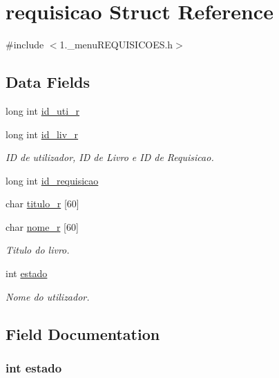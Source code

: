 \hypertarget{structrequisicao}{\section{requisicao Struct Reference}
\label{structrequisicao}
}


{\ttfamily \#include $<$1.\+\_\+menu\+R\+E\+Q\+U\+I\+S\+I\+C\+O\+E\+S.\+h$>$}

\subsection*{Data Fields}
\begin{DoxyCompactItemize}
\item 
long int \hyperlink{structrequisicao_a46ba42e509577cf7ad9429d2293ff577}{id\+\_\+uti\+\_\+r}
\item 
long int \hyperlink{structrequisicao_af636ce6e374d3e55eeb00565c29faf01}{id\+\_\+liv\+\_\+r}
\begin{DoxyCompactList}\small\item\em I\+D de utilizador, I\+D de Livro e I\+D de Requisicao. \end{DoxyCompactList}\item 
long int \hyperlink{structrequisicao_a83bcbbb52167d11b977097b6e3c282c9}{id\+\_\+requisicao}
\item 
char \hyperlink{structrequisicao_aa943485cb21e39e8c25250f36453db59}{titulo\+\_\+r} \mbox{[}60\mbox{]}
\item 
char \hyperlink{structrequisicao_a1c7ba6d3e1e3e317652826e28fd517aa}{nome\+\_\+r} \mbox{[}60\mbox{]}
\begin{DoxyCompactList}\small\item\em Titulo do livro. \end{DoxyCompactList}\item 
int \hyperlink{structrequisicao_a876d08c1d21086e4fd228744da10d028}{estado}
\begin{DoxyCompactList}\small\item\em Nome do utilizador. \end{DoxyCompactList}\end{DoxyCompactItemize}


\subsection{Field Documentation}
\hypertarget{structrequisicao_a876d08c1d21086e4fd228744da10d028}{
\subsubsection[{estado}]{\setlength{\rightskip}{0pt plus 5cm}int estado}}\label{structrequisicao_a876d08c1d21086e4fd228744da10d028}


